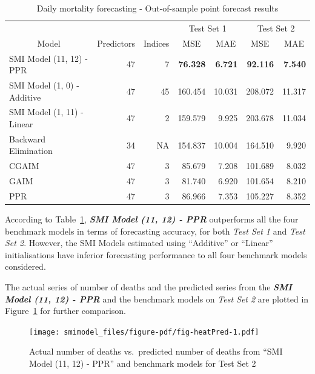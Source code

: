 \documentclass[11pt,a4paper,]{article}
\begin{document}
\hypertarget{tbl-heat}{}
\begin{table}[!h]
\caption{\label{tbl-heat}Daily mortality forecasting - Out-of-sample point forecast results }\tabularnewline

\centering
\begin{tabular}{lrr>{}r>{}r>{}r>{}r}
\toprule
\multicolumn{1}{c}{} & \multicolumn{1}{c}{} & \multicolumn{1}{c}{} & \multicolumn{2}{c}{Test Set 1} & \multicolumn{2}{c}{Test Set 2} \\
\cmidrule(l{3pt}r{3pt}){4-5} \cmidrule(l{3pt}r{3pt}){6-7}
\multicolumn{1}{c}{Model} & \multicolumn{1}{c}{Predictors} & \multicolumn{1}{c}{Indices} & \multicolumn{1}{c}{MSE} & \multicolumn{1}{c}{MAE} & \multicolumn{1}{c}{MSE} & \multicolumn{1}{c}{MAE}\\
\midrule
SMI Model (11, 12) - PPR & 47 & 7 & \textbf{76.328} & \textbf{6.721} & \textbf{92.116} & \textbf{7.540}\\
SMI Model (1, 0) - Additive & 47 & 45 & 160.454 & 10.031 & 208.072 & 11.317\\
SMI Model (1, 11) - Linear & 47 & 2 & 159.579 & 9.925 & 203.678 & 11.034\\
Backward Elimination & 34 & NA & 154.837 & 10.004 & 164.510 & 9.920\\
CGAIM & 47 & 3 & 85.679 & 7.208 & 101.689 & 8.032\\
\addlinespace
GAIM & 47 & 3 & 81.740 & 6.920 & 101.654 & 8.210\\
PPR & 47 & 3 & 86.966 & 7.353 & 105.227 & 8.352\\
\bottomrule
\end{tabular}
\end{table}

According to Table~\ref{tbl-heat}, \textbf{\emph{SMI Model (11, 12) -
PPR}} outperforms all the four benchmark models in terms of forecasting
accuracy, for both \emph{Test Set 1} and \emph{Test Set 2}. However, the
SMI Models estimated using ``Additive'' or ``Linear'' initialisations
have inferior forecasting performance to all four benchmark models
considered.

The actual series of number of deaths and the predicted series from the
\textbf{\emph{SMI Model (11, 12) - PPR}} and the benchmark models on
\emph{Test Set 2} are plotted in Figure~\ref{fig-heatPred} for further
comparison.

\begin{figure}

{\centering \texttt{[image: smimodel\_files/figure-pdf/fig-heatPred-1.pdf]}

}

\caption{\label{fig-heatPred}Actual number of deaths vs.~predicted
number of deaths from ``SMI Model (11, 12) - PPR'' and benchmark models
for Test Set 2}

\end{figure}
\end{document}
